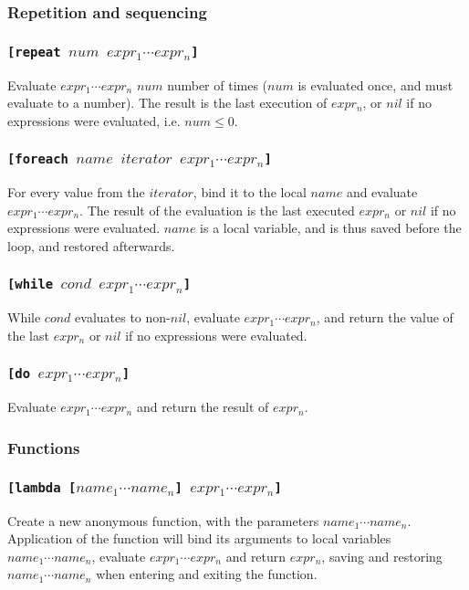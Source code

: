 \documentclass[11pt]{report}
\begin{document}
\subsubsection{Repetition and sequencing}
\subsubsection*{\tt{[repeat }$num$ $expr_1 \cdots expr_n$\tt{]}}
Evaluate $expr_1 \cdots expr_n$ $num$ number of times ($num$ is evaluated once, and must evaluate to a number). The result is the last execution of $expr_n$, or $nil$ if no expressions were evaluated, i.e. $num \leq 0$.

\subsubsection*{\tt{[foreach }$name$ $iterator$ $expr_1 \cdots expr_n$\tt{]}}
For every value from the $iterator$, bind it to the local $name$ and evaluate $expr_1 \cdots expr_n$. The result of the evaluation is the last executed $expr_n$ or $nil$ if no expressions were evaluated. $name$ is a local variable, and is thus saved before the loop, and restored afterwards.

\subsubsection*{\tt{[while }$cond$ $expr_1 \cdots expr_n$\tt{]}}
While $cond$ evaluates to non-$nil$, evaluate $expr_1 \cdots expr_n$, and return the value of the last $expr_n$ or $nil$ if no expressions were evaluated.


\subsubsection*{\tt{[do }$expr_1 \cdots expr_n$\tt{]}}
Evaluate $expr_1 \cdots expr_n$ and return the result of $expr_n$.


\subsubsection{Functions}
\subsubsection*{\tt{[lambda [}$name_1 \cdots name_n$\tt{]} $expr_1 \cdots expr_n$\tt{]}}
Create a new anonymous function, with the parameters $name_1\cdots name_n$. Application of the function will bind its arguments to local variables $name_1\cdots name_n$, evaluate $expr_1\cdots expr_n$ and return $expr_n$, saving and restoring $name_1\cdots name_n$ when entering and exiting the function.
\end{document}
